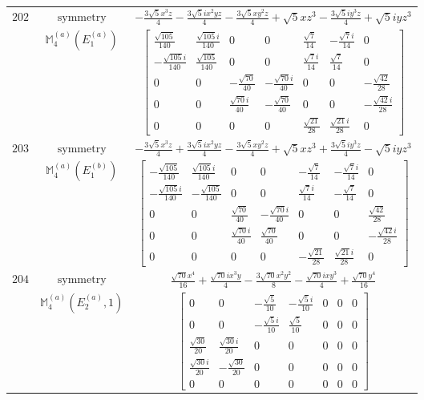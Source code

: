 \documentclass[fleqn,8pt,landscape]{jsarticle}
\begin{document}
\begin{longtable}{ccc}
$ 202 $ & $ \text{symmetry} $ & $ - \frac{3 \sqrt{5} x^{3} z}{4} - \frac{3 \sqrt{5} i x^{2} y z}{4} - \frac{3 \sqrt{5} x y^{2} z}{4} + \sqrt{5} x z^{3} - \frac{3 \sqrt{5} i y^{3} z}{4} + \sqrt{5} i y z^{3} $ \\
$  $ & $ \mathbb{M}_{4}^{(a)}(E_{1}^{(a)}) $ & $ \begin{bmatrix} \frac{\sqrt{105}}{140} & \frac{\sqrt{105} i}{140} & 0 & 0 & \frac{\sqrt{7}}{14} & - \frac{\sqrt{7} i}{14} & 0 \\ - \frac{\sqrt{105} i}{140} & \frac{\sqrt{105}}{140} & 0 & 0 & \frac{\sqrt{7} i}{14} & \frac{\sqrt{7}}{14} & 0 \\ 0 & 0 & - \frac{\sqrt{70}}{40} & - \frac{\sqrt{70} i}{40} & 0 & 0 & - \frac{\sqrt{42}}{28} \\ 0 & 0 & \frac{\sqrt{70} i}{40} & - \frac{\sqrt{70}}{40} & 0 & 0 & - \frac{\sqrt{42} i}{28} \\ 0 & 0 & 0 & 0 & \frac{\sqrt{21}}{28} & \frac{\sqrt{21} i}{28} & 0 \end{bmatrix} $ \\ \hline
$ 203 $ & $ \text{symmetry} $ & $ - \frac{3 \sqrt{5} x^{3} z}{4} + \frac{3 \sqrt{5} i x^{2} y z}{4} - \frac{3 \sqrt{5} x y^{2} z}{4} + \sqrt{5} x z^{3} + \frac{3 \sqrt{5} i y^{3} z}{4} - \sqrt{5} i y z^{3} $ \\
$  $ & $ \mathbb{M}_{4}^{(a)}(E_{1}^{(b)}) $ & $ \begin{bmatrix} - \frac{\sqrt{105}}{140} & \frac{\sqrt{105} i}{140} & 0 & 0 & - \frac{\sqrt{7}}{14} & - \frac{\sqrt{7} i}{14} & 0 \\ - \frac{\sqrt{105} i}{140} & - \frac{\sqrt{105}}{140} & 0 & 0 & \frac{\sqrt{7} i}{14} & - \frac{\sqrt{7}}{14} & 0 \\ 0 & 0 & \frac{\sqrt{70}}{40} & - \frac{\sqrt{70} i}{40} & 0 & 0 & \frac{\sqrt{42}}{28} \\ 0 & 0 & \frac{\sqrt{70} i}{40} & \frac{\sqrt{70}}{40} & 0 & 0 & - \frac{\sqrt{42} i}{28} \\ 0 & 0 & 0 & 0 & - \frac{\sqrt{21}}{28} & \frac{\sqrt{21} i}{28} & 0 \end{bmatrix} $ \\ \hline
$ 204 $ & $ \text{symmetry} $ & $ \frac{\sqrt{70} x^{4}}{16} + \frac{\sqrt{70} i x^{3} y}{4} - \frac{3 \sqrt{70} x^{2} y^{2}}{8} - \frac{\sqrt{70} i x y^{3}}{4} + \frac{\sqrt{70} y^{4}}{16} $ \\
$  $ & $ \mathbb{M}_{4}^{(a)}(E_{2}^{(a)},1) $ & $ \begin{bmatrix} 0 & 0 & - \frac{\sqrt{5}}{10} & - \frac{\sqrt{5} i}{10} & 0 & 0 & 0 \\ 0 & 0 & - \frac{\sqrt{5} i}{10} & \frac{\sqrt{5}}{10} & 0 & 0 & 0 \\ \frac{\sqrt{30}}{20} & \frac{\sqrt{30} i}{20} & 0 & 0 & 0 & 0 & 0 \\ \frac{\sqrt{30} i}{20} & - \frac{\sqrt{30}}{20} & 0 & 0 & 0 & 0 & 0 \\ 0 & 0 & 0 & 0 & 0 & 0 & 0 \end{bmatrix} $ \\ \hline

\end{longtable}
\end{document}

